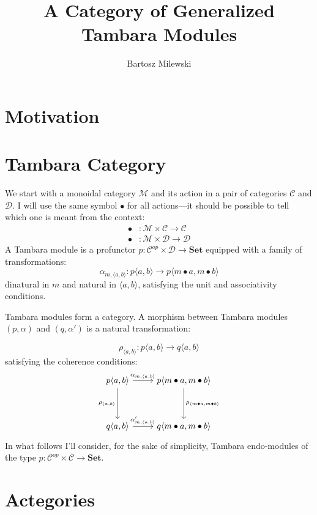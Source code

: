 \documentclass[11pt]{amsart}
\author{Bartosz Milewski}
\title{A Category of Generalized Tambara Modules}
\newcommand{\cat}[1]{\mathcal{#1}}%
\newcommand{\Cat}[1]{\mathbf{#1}}%
\begin{document}
\maketitle{}

\section{Motivation}

\section{Tambara Category}

We start with a monoidal category $\cat M$ and its action in a pair of categories $\cat C$ and $ \cat D$. I will use the same symbol $\bullet$ for all actions---it should be possible to tell which one is meant from the context:
\begin{align*} 
\bullet &\colon \cat M \times \cat C \to \cat C 
\\
 \bullet &\colon \cat M \times \cat D \to \cat D 
\end{align*}
A Tambara module is a profunctor $p \colon \cat C^{op} \times \cat D \to \Cat{Set}$ equipped with a family of transformations:
\[ \alpha_{m, \langle a, b \rangle} \colon p \langle a, b \rangle \to p \langle m \bullet a, m \bullet b \rangle \]
dinatural in $m$ and natural in $\langle a, b \rangle$, satisfying the unit and associativity conditions. 

Tambara modules form a category.  A morphism between Tambara modules $(p, \alpha)$ and $(q, \alpha')$ is a natural transformation:

\[ \rho_{\langle a, b \rangle} \colon p \langle a, b \rangle \to q \langle a, b \rangle \]
 satisfying the coherence conditions:
\[
 \begin{tikzcd}
 p \langle a, b \rangle
 \arrow[r, "{\alpha_{m, \langle a, b \rangle}}"]
 \arrow[dd, "{\rho_{ \langle a, b \rangle}}"']
& p \langle m \bullet a, m \bullet b \rangle
 \arrow[dd, "{\rho_{\langle m \bullet a, m \bullet b \rangle}}"]
 \\
  \\
 q \langle a, b \rangle
 \arrow[r, "{\alpha'_{m, \langle a, b \rangle}}"]
& q \langle m \bullet a, m \bullet b \rangle
 \end{tikzcd}
\]
In what follows I'll consider, for the sake of simplicity, Tambara endo-modules of the type  $p \colon \cat C^{op} \times \cat C \to \Cat{Set}$.

\section{Actegories}
\end{document}
